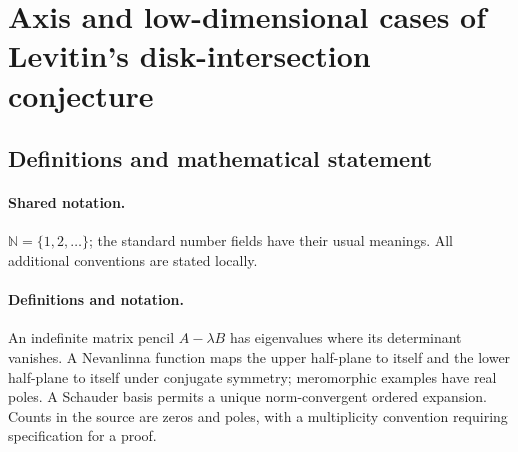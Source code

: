 \documentclass[11pt]{article}
\begin{document}
\section{Axis and low-dimensional cases of Levitin's disk-intersection conjecture}\label{statement}

\subsection{Definitions and mathematical statement}

\paragraph{Shared notation.}$\mathbb N=\{1,2,\ldots\}$; the standard number fields have their usual meanings. All additional conventions are stated locally.


\paragraph{Definitions and notation.}An indefinite matrix pencil $A-\lambda B$ has eigenvalues where its determinant vanishes. A Nevanlinna function maps the upper half-plane to itself and the lower half-plane to itself under conjugate symmetry; meromorphic examples have real poles. A Schauder basis permits a unique norm-convergent ordered expansion. Counts in the source are zeros and poles, with a multiplicity convention requiring specification for a proof.
\end{document}
